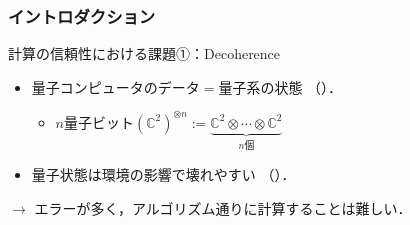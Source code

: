 \documentclass{beamer} %
\newcommand{\C}{\mathbb{C}}%
\renewcommand{\phi}{\varphi}
\newcommand{\0}{\mathbf{0}}
\newcommand{\1}{\mathbf{1}}
\newcommand{\2}{\mathbf{2}}
\newcommand{\QBit}{\mathrm{QBit}}
\begin{document}
\begin{frame}
  \frametitle{イントロダクション}
  \begin{block}{計算の信頼性における課題①：Decoherence}
    \begin{itemize}
      \item 量子コンピュータのデータ\(=\)量子系の状態
            （）．
            \begin{itemize}
              \item \(n\)量子ビット\((\C^2)^{\otimes n}:=\underbrace{
                      \C^2\otimes\cdots\otimes\C^2}_{n\text{個}}\)
            \end{itemize}
      \item 量子状態は環境の影響で壊れやすい
            （）．
    \end{itemize}
    \begin{center}
      \(\longrightarrow\)
      エラーが多く，アルゴリズム通りに計算することは難しい．
    \end{center}
  \end{block}

\end{frame}
\end{document}
